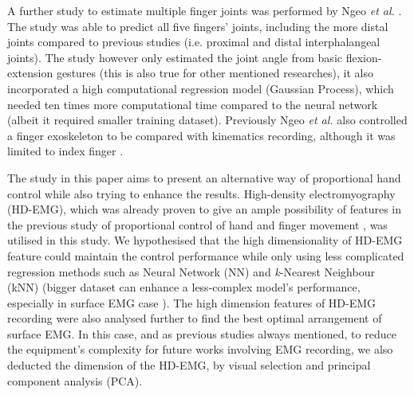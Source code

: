 \documentclass[conference]{IEEEtran}
\begin{document}
A further study to estimate multiple finger joints was performed by Ngeo \textit{et al.} \cite{b16}\cite{b17}. The study was 
able to predict all five fingers’ joints, including the more distal joints compared to previous studies (i.e. 
proximal and distal interphalangeal joints). The study however only estimated the joint angle from basic 
flexion-extension gestures (this is also true for other mentioned researches), it also incorporated a high 
computational regression model (Gaussian Process), which needed ten times more computational time 
compared to the neural network (albeit it required smaller training dataset). Previously Ngeo \textit{et al.} also 
controlled a finger exoskeleton to be compared with kinematics recording, although it was limited to index 
finger \cite{b18}.


The study in this paper aims to present an alternative way of proportional hand control while also trying 
to enhance the results. High-density electromyography (HD-EMG), which was already proven to give an 
ample possibility of features in the previous study of proportional control of hand \cite{b9} and finger movement 
\cite{b2}\cite{b19}, was utilised in this study. We hypothesised that the high dimensionality of HD-EMG feature could maintain the control performance while only using less complicated regression methods such as Neural
Network (NN) and \textit{k}-Nearest Neighbour (kNN) (bigger dataset can enhance a less-complex model’s 
performance, especially in surface EMG case \cite{b21}). The high dimension features of HD-EMG recording 
were also analysed further to find the best optimal arrangement of surface EMG. In this case, and as previous 
studies always mentioned, to reduce the equipment’s complexity for future works involving EMG recording, 
we also deducted the dimension of the HD-EMG, by visual selection and principal component analysis 
(PCA).
\end{document}
